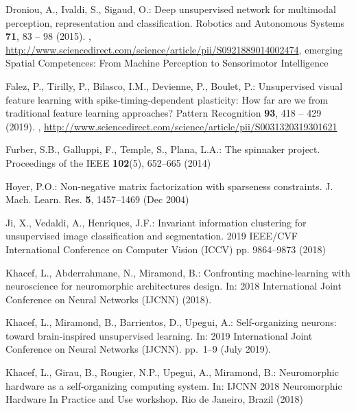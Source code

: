 \documentclass[runningheads]{llncs}
\begin{document}
\begin{thebibliography}{10}
Droniou, A., Ivaldi, S., Sigaud, O.: Deep unsupervised network for multimodal
  perception, representation and classification. Robotics and Autonomous
  Systems  \textbf{71},  83 -- 98 (2015).
  ,
  \url{http://www.sciencedirect.com/science/article/pii/S0921889014002474},
  emerging Spatial Competences: From Machine Perception to Sensorimotor
  Intelligence

Falez, P., Tirilly, P., Bilasco, I.M., Devienne, P., Boulet, P.: Unsupervised
  visual feature learning with spike-timing-dependent plasticity: How far are
  we from traditional feature learning approaches? Pattern Recognition
  \textbf{93},  418 -- 429 (2019).
  ,
  \url{http://www.sciencedirect.com/science/article/pii/S0031320319301621}

{Furber}, S.B., {Galluppi}, F., {Temple}, S., {Plana}, L.A.: The spinnaker
  project. Proceedings of the IEEE  \textbf{102}(5),  652--665 (2014)

Hoyer, P.O.: Non-negative matrix factorization with sparseness constraints. J.
  Mach. Learn. Res.  \textbf{5},  1457–1469 (Dec 2004)

Ji, X., Vedaldi, A., Henriques, J.F.: Invariant information clustering for
  unsupervised image classification and segmentation. 2019 IEEE/CVF
  International Conference on Computer Vision (ICCV) pp. 9864--9873 (2018)

Khacef, L., Abderrahmane, N., Miramond, B.: Confronting machine-learning with
  neuroscience for neuromorphic architectures design. In: 2018 International
  Joint Conference on Neural Networks (IJCNN) (2018).

{Khacef}, L., {Miramond}, B., {Barrientos}, D., {Upegui}, A.: Self-organizing
  neurons: toward brain-inspired unsupervised learning. In: 2019 International
  Joint Conference on Neural Networks (IJCNN). pp.~1--9 (July 2019).

Khacef, L., Girau, B., Rougier, N.P., Upegui, A., Miramond, B.: {Neuromorphic
  hardware as a self-organizing computing system}. In: {IJCNN 2018 Neuromorphic
  Hardware In Practice and Use workshop}. Rio de Janeiro, Brazil (2018)


\end{thebibliography}
\end{document}
